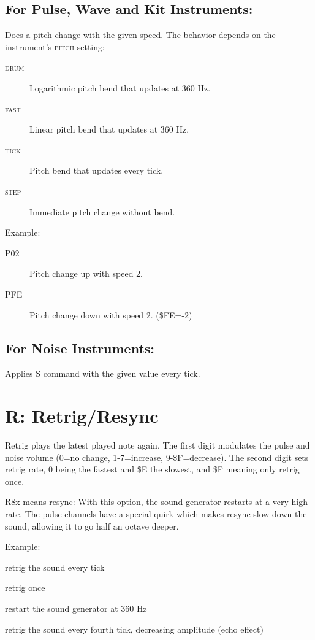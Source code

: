 \subsection{For Pulse, Wave and Kit Instruments:}

Does a pitch change with the given speed. The behavior depends on the instrument's \textsc{pitch} setting:

\begin{description}
    \item[\textsc{drum}] Logarithmic pitch bend that updates at 360 Hz.
    \item[\textsc{fast}] Linear pitch bend that updates at 360 Hz.
    \item[\textsc{tick}] Pitch bend that updates every tick.
    \item[\textsc{step}] Immediate pitch change without bend.
\end{description}

Example:

\begin{description}
\item[P02] Pitch change up with speed 2.
\item[PFE] Pitch change down with speed 2. (\$FE=-2)
\end{description}

\subsection{For Noise Instruments:}

Applies S command with the given value every tick.

\section{R: Retrig/Resync}

Retrig plays the latest played note again. The first digit modulates the pulse and noise volume (0=no change, 1-7=increase, 9-\$F=decrease). The second digit sets retrig rate, 0 being the fastest and \$E the slowest, and \$F meaning only retrig once.

R8x means resync: With this option, the sound generator restarts at a very high rate. The pulse channels have a special quirk which makes resync slow down the sound, allowing it to go half an octave deeper.

\begin{description}
\item Example:
\item[R00] retrig the sound every tick
\item[R0F] retrig once
\item[R80] restart the sound generator at 360 Hz
\item[RF3] retrig the sound every fourth tick, decreasing amplitude (echo effect)
\end{description}

